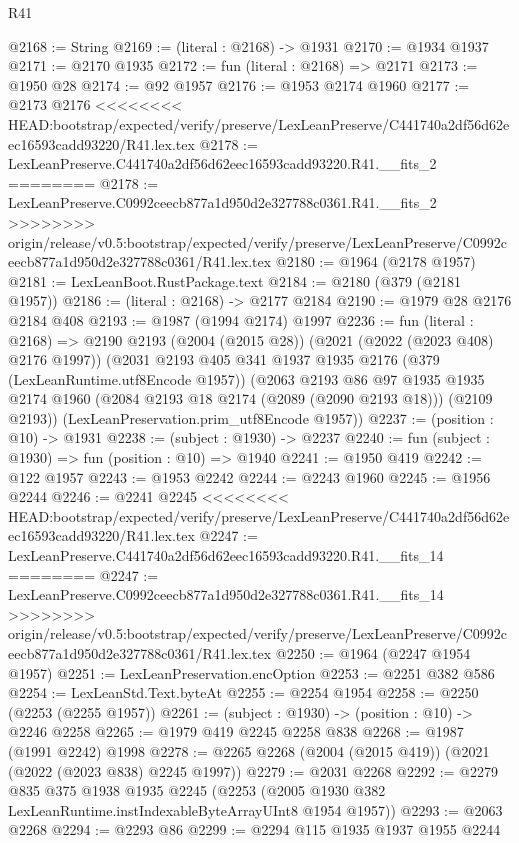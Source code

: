 \begin{lexlean}{R41}
\begin{coremodule}
{{{{{{{{{{{{{{{{{{{{{{{{{{{{{{{{{{{{{{{{{{{{{{{{{{{{{{{{{{{{{{{{{{{{{{{{{{{{{{{{{{{{{{{@2168 := String
@2169 := (literal : @2168) -> @1931
@2170 := @1934 @1937
@2171 := @2170 @1935
@2172 := fun (literal : @2168) => @2171
@2173 := @1950 @28
@2174 := @92 @1957
@2176 := @1953 @2174 @1960
@2177 := @2173 @2176
<<<<<<<< HEAD:bootstrap/expected/verify/preserve/LexLeanPreserve/C441740a2df56d62eec16593cadd93220/R41.lex.tex
@2178 := LexLeanPreserve.C441740a2df56d62eec16593cadd93220.R41.__fits_2
========
@2178 := LexLeanPreserve.C0992ceecb877a1d950d2e327788c0361.R41.__fits_2
>>>>>>>> origin/release/v0.5:bootstrap/expected/verify/preserve/LexLeanPreserve/C0992ceecb877a1d950d2e327788c0361/R41.lex.tex
@2180 := @1964 (@2178 @1957)
@2181 := LexLeanBoot.RustPackage.text
@2184 := @2180 (@379 (@2181 @1957))
@2186 := (literal : @2168) -> @2177 @2184
@2190 := @1979 @28 @2176 @2184 @408
@2193 := @1987 (@1994 @2174) @1997
@2236 := fun (literal : @2168) =>
  @2190
    @2193
    (@2004 (@2015 @28))
    (@2021 (@2022 (@2023 @408) @2176 @1997))
    (@2031
      @2193
      @405
      @341
      @1937
      @1935
      @2176
      (@379 (LexLeanRuntime.utf8Encode @1957))
      (@2063
        @2193
        @86
        @97
        @1935
        @1935
        @2174
        @1960
        (@2084 @2193 @18 @2174 (@2089 (@2090 @2193 @18)))
        (@2109 @2193))
      (LexLeanPreservation.prim_utf8Encode @1957))
@2237 := (position : @10) -> @1931
@2238 := (subject : @1930) -> @2237
@2240 := fun (subject : @1930) => fun (position : @10) => @1940
@2241 := @1950 @419
@2242 := @122 @1957
@2243 := @1953 @2242
@2244 := @2243 @1960
@2245 := @1956 @2244
@2246 := @2241 @2245
<<<<<<<< HEAD:bootstrap/expected/verify/preserve/LexLeanPreserve/C441740a2df56d62eec16593cadd93220/R41.lex.tex
@2247 := LexLeanPreserve.C441740a2df56d62eec16593cadd93220.R41.__fits_14
========
@2247 := LexLeanPreserve.C0992ceecb877a1d950d2e327788c0361.R41.__fits_14
>>>>>>>> origin/release/v0.5:bootstrap/expected/verify/preserve/LexLeanPreserve/C0992ceecb877a1d950d2e327788c0361/R41.lex.tex
@2250 := @1964 (@2247 @1954 @1957)
@2251 := LexLeanPreservation.encOption
@2253 := @2251 @382 @586
@2254 := LexLeanStd.Text.byteAt
@2255 := @2254 @1954
@2258 := @2250 (@2253 (@2255 @1957))
@2261 := (subject : @1930) -> (position : @10) -> @2246 @2258
@2265 := @1979 @419 @2245 @2258 @838
@2268 := @1987 (@1991 @2242) @1998
@2278 := @2265 @2268 (@2004 (@2015 @419)) (@2021 (@2022 (@2023 @838) @2245 @1997))
@2279 := @2031 @2268
@2292 := @2279
    @835
    @375
    @1938
    @1935
    @2245
    (@2253 (@2005 @1930 @382 LexLeanRuntime.instIndexableByteArrayUInt8 @1954 @1957))
@2293 := @2063 @2268
@2294 := @2293 @86
@2299 := @2294 @115 @1935 @1937 @1955 @2244
}}}}}}}}}}}}}}}}}}}}}}}}}}}}}}}}}}}}}}}}}}}}}}}}}}}}}}}}}}}}}}}}}}}}}}}}}}}}}}}}}}}}}}}
\end{coremodule}
\end{lexlean}
